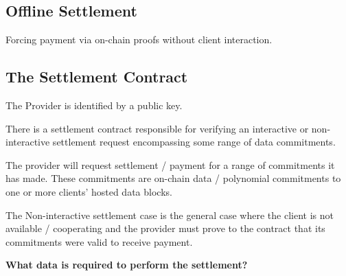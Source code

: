 \documentclass{article}
\begin{document}
\subsection{Offline Settlement}

Forcing payment via on-chain proofs without client interaction.


\subsection{The Settlement Contract}

The Provider is identified by a public key.  

There is a settlement contract responsible for verifying an interactive or non-interactive settlement request encompassing some range of data commitments.

The provider will request settlement / payment for a range of commitments it has made.  These commitments are on-chain data / polynomial commitments to one or more clients’ hosted data blocks.

The Non-interactive settlement case is the general case where the client is not available / cooperating and the provider must prove to the contract that its commitments were valid to receive payment.

\textbf{What data is required to perform the settlement?}
\end{document}
